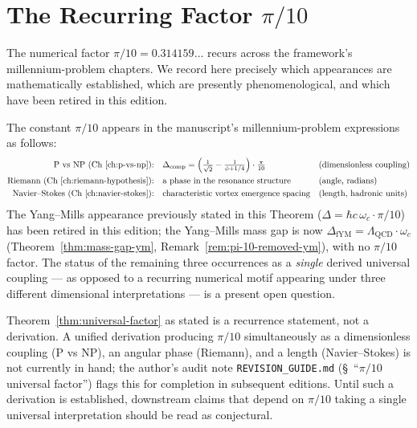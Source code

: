 \section{The Recurring Factor $\pi/10$}\label{sec:pi-over-10-ym}

The numerical factor $\pi/10 = 0.314159\ldots$ recurs across the framework's millennium-problem chapters. We record here precisely which appearances are mathematically established, which are presently phenomenological, and which have been retired in this edition.

\begin{theorem}\label{thm:universal-factor}
The constant $\pi/10$ appears in the manuscript's millennium-problem expressions as follows:
\begin{align}
\text{P vs NP (Ch~\ref{ch:p-vs-np}):} \quad & \Delta_{\text{comp}} = \left(\tfrac{1}{\sqrt{2}} - \tfrac{1}{\phi+1/4}\right) \cdot \tfrac{\pi}{10} && \text{(dimensionless coupling)}\\
\text{Riemann (Ch~\ref{ch:riemann-hypothesis}):} \quad & \text{a phase in the resonance structure} && \text{(angle, radians)}\\
\text{Navier--Stokes (Ch~\ref{ch:navier-stokes}):} \quad & \text{characteristic vortex emergence spacing} && \text{(length, hadronic units)}
\end{align}
The Yang--Mills appearance previously stated in this Theorem ($\Delta = \hbar c\,\omega_c \cdot \pi/10$) has been retired in this edition; the Yang--Mills mass gap is now $\Delta_{\mathrm{fYM}} = \Lambda_{\mathrm{QCD}} \cdot \omega_c$ (Theorem~\ref{thm:mass-gap-ym}, Remark~\ref{rem:pi-10-removed-ym}), with no $\pi/10$ factor. The status of the remaining three occurrences as a \emph{single} derived universal coupling — as opposed to a recurring numerical motif appearing under three different dimensional interpretations — is a present open question.
\end{theorem}

\begin{remark}\label{rem:universality-status}
Theorem~\ref{thm:universal-factor} as stated is a recurrence statement, not a derivation. A unified derivation producing $\pi/10$ simultaneously as a dimensionless coupling (P vs NP), an angular phase (Riemann), and a length (Navier--Stokes) is not currently in hand; the author's audit note \texttt{REVISION\_GUIDE.md} (\S~``$\pi/10$ universal factor'') flags this for completion in subsequent editions. Until such a derivation is established, downstream claims that depend on $\pi/10$ taking a single universal interpretation should be read as conjectural.
\end{remark}

